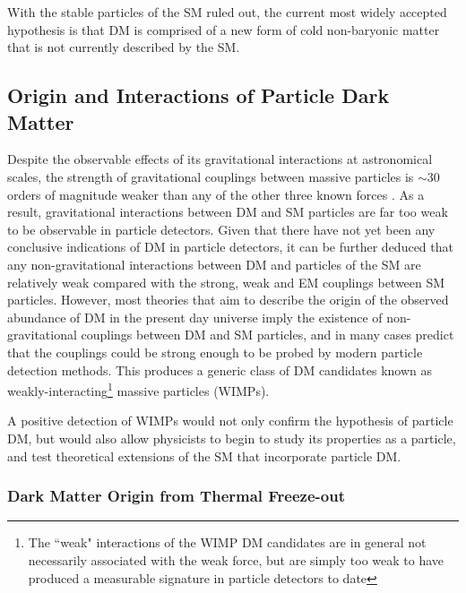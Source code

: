 With the stable particles of the SM ruled out, the current most widely accepted hypothesis is that DM is comprised of a new form of cold non-baryonic matter that is not currently described by the SM.

\subsection{Origin and Interactions of Particle Dark Matter}
\label{sec:dm_origins}

Despite the observable effects of its gravitational interactions at astronomical scales, the strength of gravitational couplings between massive particles is \(\sim30\) orders of magnitude weaker than any of the other three known forces \cite{griffiths_2008}. As a result, gravitational interactions between DM and SM particles are far too weak to be observable in particle detectors. Given that there have not yet been any conclusive indications of DM in particle detectors, it can be further deduced that any non-gravitational interactions between DM and particles of the SM are relatively weak compared with the strong, weak and EM couplings between SM particles. However, most theories that aim to describe the origin of the observed abundance of DM in the present day universe imply the existence of non-gravitational couplings between DM and SM particles, and in many cases predict that the couplings could be strong enough to be probed by modern particle detection methods. This produces a generic class of DM candidates known as weakly-interacting\footnote{The ``weak" interactions of the WIMP DM candidates are in general not necessarily associated with the weak force, but are simply too weak to have produced a measurable signature in particle detectors to date} massive particles (WIMPs). 

A positive detection of WIMPs would not only confirm the hypothesis of particle DM, but would also allow physicists to begin to study its properties as a particle, and test theoretical extensions of the SM that incorporate particle DM.

\subsubsection{Dark Matter Origin from Thermal Freeze-out}

